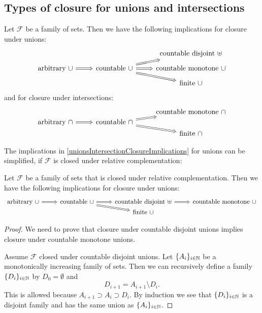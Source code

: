 \subsection{Types of closure for unions and intersections}
\begin{lemma} \label{unionsIntersectionClosureImplications}
Let $\mathcal{F}$ be a family of sets. Then we have the following implications for closure under unions:
\[ \begin{tikzcd}[row sep=tiny]
&& \text{countable disjoint $\uplus$} \\
\text{arbitrary $\cup$} \arrow[r, Rightarrow] & \text{countable $\cup$} \arrow[ur, Rightarrow] \arrow[r, Rightarrow] \arrow[dr, Rightarrow] & \text{countable monotone $\cup$} \\
&& \text{finite $\cup$}
\end{tikzcd} \]
and for closure under intersections:
\[ \begin{tikzcd}[row sep=0em]
&& \text{countable monotone $\cap$} \\
\text{arbitrary $\cap$} \arrow[r, Rightarrow] & \text{countable $\cap$} \arrow[ur, Rightarrow] \arrow[dr, Rightarrow] &  \\
&& \text{finite $\cap$}
\end{tikzcd} \]
\end{lemma}


The implications in \ref{unionsIntersectionClosureImplications} for unions can be simplified, if $\mathcal{F}$ is closed under relative complementation:
\begin{lemma} \label{typesOfUnionsRelativeComplementation}
Let $\mathcal{F}$ be a family of sets that is closed under relative complementation. Then we have the following implications for closure under unions:
\[ \begin{tikzcd}[row sep=0em]
\text{arbitrary $\cup$} \arrow[r, Rightarrow] & \text{countable $\cup$} \arrow[r, Rightarrow] \arrow[dr, Rightarrow] & \text{countable disjoint $\uplus$} \arrow[r, Rightarrow] & \text{countable monotone $\cup$} \\
&& \text{finite $\cup$} &
\end{tikzcd} \]
\end{lemma}
\begin{proof}
We need to prove that closure under countable disjoint unions implies closure under countable monotone unions.

Assume $\mathcal{F}$ closed under countable disjoint unions. Let $\{A_i\}_{i\in \mathbb{N}}$ be a monotonically increasing family of sets. Then we can recursively define a family $\{D_i\}_{i\in \mathbb{N}}$ by $D_0=\emptyset$ and
\[ D_{i+1} = A_{i+1}\setminus D_i. \]
This is allowed because $A_{i+1}\supset A_i \supset D_i$. By induction we see that $\{D_i\}_{i\in \mathbb{N}}$ is a disjoint family and has the same union as $\{A_i\}_{i\in \mathbb{N}}$.
\end{proof}

